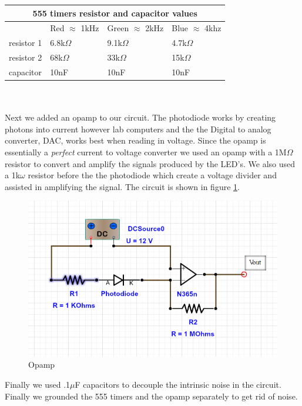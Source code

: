 \documentclass[paper=letter, fontsize=12pt]{article}
\begin{document}
\begin{tabular}{ |p{3cm}||p{3cm}|p{3cm}|p{3cm}|  }
 \hline
 \multicolumn{4}{|c|}{555 timers resistor and capacitor values} \\
 \hline
 			&  Red $\approx$ 1kHz	& Green $\approx$ 2kHz	& Blue $\approx$ 4khz\\
 \hline
 resistor 1  & 	6.8k$\Omega$	& 9.1k$\Omega$			& 		4.7k$\Omega$	\\
 \hline
 resistor 2  & 	68k$\Omega$		& 	33k$\Omega$			& 		15k$\Omega$		\\
 \hline
 capacitor   & 	10nF			& 	10nF				& 		10nF			\\

 \hline
 \hline
\end{tabular}\\
\\

Next we added an opamp to our circuit. The photodiode works by creating photons into current however lab computers and the the Digital to analog converter, DAC, works best when reading in voltage. Since the opamp is essentially a \textit{perfect} current to voltage converter we used an opamp with a 1M$\Omega$ resistor to convert and amplify the signals produced by the LED's. We also used a 1k$\omega$ resistor before the the photodiode which create a voltage divider and assisted in amplifying the signal. The circuit is shown in figure \ref*{amplify}. 



	\begin{figure}[H]
	\centering
	\includegraphics[scale=.6]{amplify.png}
	\caption{Opamp}
	\label{amplify}
	\end{figure}

	Finally we used .1$\mu$F capacitors to decouple the intrinsic noise in the circuit. Finally we grounded the 555 timers and the opamp separately to get rid of noise. 
\end{document}
